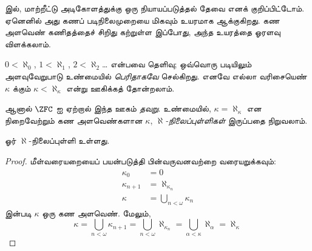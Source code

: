 \documentclass[../../../include/open-logic-section]{subfiles}
\begin{document}

 இல், மாற்றீட்டு அடிகோளத்துக்கு ஒரு
நியாயப்படுத்தல் தேவை எனக் குறிப்பிட்டோம். ஏனெனில் அது கணப்
படிநிலைமுறையை மிகவும் உயரமாக ஆக்குகிறது. கண அளவெண் கணிதத்தைச்
சிறிது கற்றுள்ள இப்போது, அந்த உயரத்தை ஓரளவு விளக்கலாம்.

$0 < \aleph_0$, $1 < \aleph_1$, $2 < \aleph_2$\ldots
என்பவை தெளிவு; ஒவ்வொரு படியிலும் அளவுவேறுபாடு உண்மையில்
\emph{பெரிதாகவே} செல்கிறது. எனவே எல்லா வரிசையெண் $\kappa$
க்கும் $\kappa< \aleph_\kappa$ என்று ஊகிக்கத் தோன்றலாம்.

ஆனால் $\ZFC$ ஐ ஏற்றால் இந்த ஊகம் \emph{தவறு}. உண்மையில்,
$\kappa=\aleph_\kappa$ என நிறைவேற்றும் கண அளவெண்களான $\kappa$,
\emph{$\aleph$-நிலைப்புள்ளிகள்} இருப்பதை நிறுவலாம்.

\begin{prop}
ஓர் $\aleph$-நிலைப்புள்ளி உள்ளது.
\end{prop}

\begin{proof}
மீள்வரையறையைப் பயன்படுத்தி பின்வருவனவற்றை வரையறுக்கவும்:
\begin{align*}
	\kappa_0 &= 0\\
	\kappa_{n+1} &= \aleph_{\kappa_n}\\
	\kappa&= \bigcup_{n < \omega}\kappa_n
\end{align*}
 இன்படி
$\kappa$ ஒரு கண அளவெண். மேலும்,
\[
	\kappa= \bigcup_{n < \omega} \kappa_{n+1} =
	\bigcup_{n < \omega}\aleph_{\kappa_n} =
	\bigcup_{\alpha < \kappa}\aleph_\alpha = \aleph_\kappa
\]
\end{proof}
\end{document}
